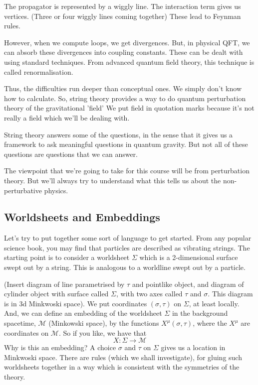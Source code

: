 \documentclass[11pt, oneside]{article}   	%
\theoremstyle{slanted}
\begin{document}
The propagator is represented by a wiggly line. 
The interaction term gives us vertices. (Three or four 
wiggly lines coming together) 
These lead to Feynman rules.

However, when we compute loops, 
we get divergences. But, in physical QFT, 
we can absorb these divergences into coupling constants. 
These can be dealt with using standard techniques. From
advanced quantum field theory, this technique 
is called renormalisation. 

Thus, the difficulties run deeper than conceptual ones. 
We simply don't know how to calculate. 
So, string theory 
provides a way to do quantum perturbation theory 
of the gravitational 'field' 
We put field in quotation marks because it's 
not really a field which we'll be dealing with. 

String theory answers some of the questions, 
in the sense that it gives 
us a framework to ask 
meaningful questions in quantum gravity. 
But not all of these questions are questions that 
we can answer. 

The viewpoint that  we're going to 
take for this course will be from 
perturbation theory. But we'll always 
try to understand what this tells us about the 
non-perturbative physics. 

\subsection{Worldsheets and Embeddings}
Let's try 
to put together some sort of language 
to get started. From any popular science book, 
you may find that particles are described 
as vibrating strings. 
The starting point is to consider a 
worldsheet $ \Sigma $ which is a 
2-dimensional surface swept out by a string. 
This is analogous to a 
worldline swept out by a particle.

(Insert diagram of line parametrised by $ \tau $  and pointlike 
object, and diagram of cylinder object with surface called 
$ \Sigma $, with two axes called $ \tau $ and $ \sigma $.   This 
diagram is in 3d Minkwoski space). 
We put coordinates $ \left( \sigma , \tau  \right)  $
on $ \Sigma $, at least locally. 
And, we can define an embedding of the worldsheet $ \Sigma $ 
in the background spacetime, $ \mathcal{ M } $ (Minkowski space),
by the functions $ X ^{ \mu } \left( \sigma, \tau  \right)  $, 
where the $ X ^ \mu $ are coordinates on 
$ \mathcal{ M }  $. So if you like, we have that 
\[
 X : \Sigma \to \mathcal{ M }
\] Why is this an embedding? 
A choice $ \sigma $ and $ \tau $ on $ \Sigma $ gives 
us a location in Minkwoski space. 
There are rules (which we shall investigate), 
for gluing such worldsheets together 
in a way which is consistent with 
the symmetries of the theory. 
\end{document}
